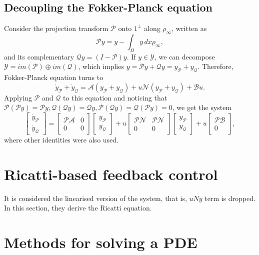 \documentclass[12pt]{article}
\newcommand{\N}{\mathcal{N}}
\newcommand{\A}{\mathcal{A}}
\newcommand{\B}{\mathcal{B}}
\renewcommand{\P}{\mathcal{P}}
\newcommand{\Q}{\mathcal{Q}}
\newcommand{\steady}{\rho_{\infty}}
\theoremstyle{definition}
\begin{document}
\subsection{Decoupling the Fokker-Planck equation}

Consider the projection transform $\mathcal{P}$ onto $1^{\perp}$ along $\steady$, written as 
\[
\mathcal{P}y = y - \int_{\Omega} y \, dx \steady,    
\]
and its complementary $\mathcal{Q}y = (I-\mathcal{P})y$.
If $y \in \mathcal{Y}$, we can decompose $\mathcal{Y} = im(\mathcal{P}) \oplus im(\mathcal{Q})$, which implies $y = \mathcal{P}y + \mathcal{Q}y = y_{\mathcal{P}} + y_{\mathcal{Q}}$.
Therefore, Fokker-Planck equation turns to
\[
\dot{y}_{\P} + \dot{y}_{\Q} = \mathcal{A}(y_{\P} + y_{\Q}) + u\N(y_{\P} + y_{\Q}) + \B u.
\]
Applying $\P$ and $\Q$ to this equation and noticing that $\P(\P y) = \P y, \Q(\Q y) = \Q y, \P(\Q y) = \Q(\P y) = 0$, we get the system
\[
\begin{bmatrix}
    \dot{y}_{\P} \\ \dot{y}_{\Q} 
\end{bmatrix} = \begin{bmatrix}
    \P\A & 0 \\ 0 & 0 
\end{bmatrix}\begin{bmatrix}
    y_{\P} \\ y_{\Q} 
\end{bmatrix} + u\begin{bmatrix}
    \P\N & \P\N \\ 0 & 0 
\end{bmatrix}\begin{bmatrix}
    y_{\P} \\ y_{\Q} 
\end{bmatrix} + u\begin{bmatrix}
    \P\B \\ 0
\end{bmatrix},
\]
where other identities were also used.

\section{Ricatti-based feedback control}

It is considered the linearised version of the system, that is, $uNy$ term is dropped.
In this section, they derive the Ricatti equation.

\section{Methods for solving a PDE}
\end{document}
